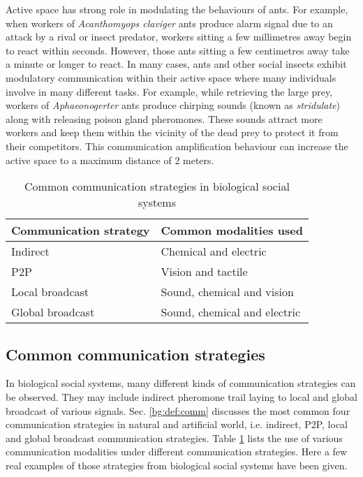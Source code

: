 Active space has strong role in modulating the behaviours of ants. For example, when workers of {\em Acanthomyops claviger} ants produce alarm signal due to an attack by a rival or insect predator, workers sitting a few millimetres away begin to react within seconds. However, those ants sitting a few centimetres away take a minute or longer to react. In many cases, ants and other social insects exhibit modulatory communication within their active space where many individuals involve in many different tasks. For example, while retrieving the large prey, workers of {\em Aphaeonogerter} ants produce chirping sounds (known as \textit{stridulate}) along with releasing poison gland pheromones. These sounds attract more workers and keep them within the vicinity of the dead prey to protect it from their competitors. This communication amplification behaviour can increase the active space to a maximum distance of 2 meters.
\begin{table}
\caption{Common communication strategies in biological social systems}
\label{table:bio-comm-strategy}
\begin{center}
\begin{tabular}{|l|l|}
\hline 
\textbf{Communication strategy} & \textbf{Common modalities used}\\
\hline 
Indirect & Chemical and electric \\
P2P &  Vision and tactile\\
Local broadcast &  Sound, chemical and vision\\
Global broadcast & Sound, chemical and electric\\
\hline
\end{tabular}
\end{center}
\end{table}
\subsection{Common communication strategies}
\label{bg:bio-comm:strategies}
In biological social systems, many different kinds of communication strategies can be observed. They may include indirect pheromone trail laying to local and global broadcast of various signals. Sec. \ref{bg:def:comm} discusses the most common four communication strategies in natural and artificial world, i.e. indirect, P2P, local and global broadcast communication strategies. Table \ref{table:bio-comm-strategy} lists the use of various communication modalities under different communication strategies. Here a few real examples of those strategies from biological social systems have been given.

